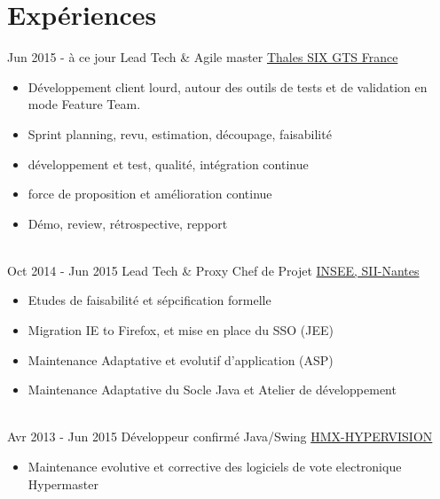 \documentclass[letterpaper]{twentysecondcv} %
\begin{document}
\makeprofile %


\section{Expériences}

\begin{twenty} %
\twentyitem
    	{Jun 2015 -}
		{à ce jour}
        {Lead Tech \& Agile master}
        {\href{https://www.thalesgroup.com/fr}{Thales SIX GTS France}}
        {}
        {\begin{itemize} 		
      	\item Développement client lourd, autour des outils de tests et de validation en mode Feature Team.
        \item Sprint planning, revu, estimation, découpage, faisabilité
        \item développement et test, qualité, intégration continue
        \item force de proposition et amélioration continue
        \item Démo, review, rétrospective, repport
        \end{itemize}}
        \\
	\twentyitem
    	{Oct 2014 -}
		{Jun 2015}
        {Lead Tech \& Proxy Chef de Projet}
        {\href{https://www.insee.fr/fr/accueil}{INSEE, SII-Nantes}}
        {}
        {
        {\begin{itemize}
		\item Etudes de faisabilité et sépcification formelle
		\item Migration IE to Firefox, et mise en place du SSO (JEE)
		\item Maintenance Adaptative et evolutif d'application (ASP)
		\item Maintenance Adaptative du Socle Java et Atelier de développement
    	\end{itemize}}
        }
     \\
     \twentyitem
   		{Avr 2013 -}
		{Jun 2015}
        {Développeur confirmé Java/Swing}
        {\href{}{HMX-HYPERVISION}}
        {}
        {
        \begin{itemize}
        \item Maintenance evolutive et corrective des logiciels de vote electronique Hypermaster

\end{itemize}}
\end{twenty}
\end{document}

